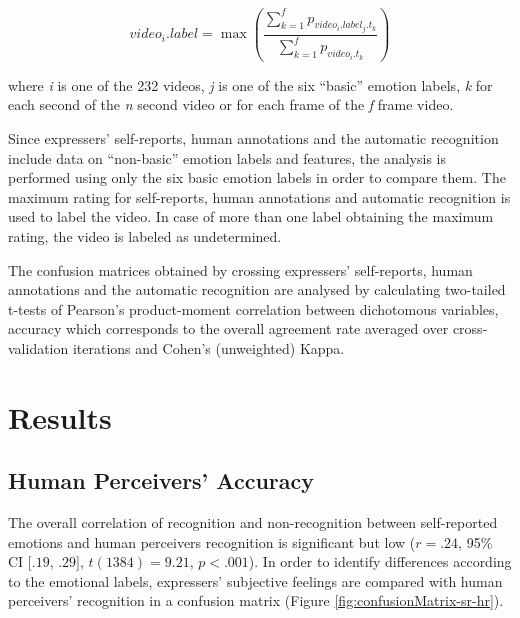 \documentclass[
  english,
  man]{apa7}
\begin{document}
\begin{equation}
video_{i}.label = \max\left(\frac{\sum_{k=1}^{f}p_{video_{i}.label_{j}.t_{k}}}{\sum_{k=1}^{f}p_{video_{i}.t_{k}}}\right)\label{eq:three}
\end{equation}

where \emph{i} is one of the 232 videos, \emph{j} is one of the six ``basic'' emotion labels, \emph{k} for each second of the \emph{n} second video or for each frame of the \emph{f} frame video.

Since expressers' self-reports, human annotations and the automatic recognition include data on ``non-basic'' emotion labels and features, the analysis is performed using only the six basic emotion labels in order to compare them. The maximum rating for self-reports, human annotations and automatic recognition is used to label the video. In case of more than one label obtaining the maximum rating, the video is labeled as undetermined.

The confusion matrices obtained by crossing expressers' self-reports, human annotations and the automatic recognition are analysed by calculating two-tailed t-tests of Pearson's product-moment correlation between dichotomous variables, accuracy which corresponds to the overall agreement rate averaged over cross-validation iterations and Cohen's (unweighted) Kappa.

\hypertarget{results}{%
\section{Results}\label{results}}

\hypertarget{human-perceivers-accuracy}{%
\subsection{Human Perceivers' Accuracy}\label{human-perceivers-accuracy}}

The overall correlation of recognition and non-recognition between self-reported emotions and human perceivers recognition is significant but low (\(r = .24\), 95\% CI \([.19\), \(.29]\), \(t(1384) = 9.21\), \(p < .001\)). In order to identify differences according to the emotional labels, expressers' subjective feelings are compared with human perceivers' recognition in a confusion matrix (Figure \ref{fig:confusionMatrix-sr-hr}).
\end{document}
